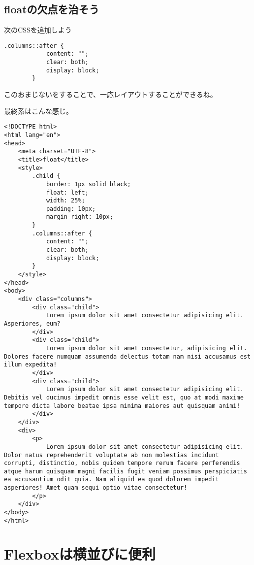 \documentclass[mingoth,11pt,a4j,uplatex]{jsarticle}
\begin{document}
\subsection{floatの欠点を治そう}
次のCSSを追加しよう
\begin{lstlisting}[caption=CSS部分2]
        .columns::after {
            content: "";
            clear: both;
            display: block;
        }
\end{lstlisting}
このおまじないをすることで、一応レイアウトすることができるね。

最終系はこんな感じ。
\begin{lstlisting}[caption=CSS部分1]
<!DOCTYPE html>
<html lang="en">
<head>
    <meta charset="UTF-8">
    <title>float</title>
    <style>
        .child {
            border: 1px solid black;
            float: left;
            width: 25%;
            padding: 10px;
            margin-right: 10px;
        }
        .columns::after {
            content: "";
            clear: both;
            display: block;
        }
    </style>
</head>
<body>
    <div class="columns">
        <div class="child">
            Lorem ipsum dolor sit amet consectetur adipisicing elit. Asperiores, eum?
        </div>
        <div class="child">
            Lorem ipsum dolor sit amet consectetur, adipisicing elit. Dolores facere numquam assumenda delectus totam nam nisi accusamus est illum expedita!
        </div>
        <div class="child">
            Lorem ipsum dolor sit amet consectetur adipisicing elit. Debitis vel ducimus impedit omnis esse velit est, quo at modi maxime tempore dicta labore beatae ipsa minima maiores aut quisquam animi!
        </div>
    </div>
    <div>
        <p>
            Lorem ipsum dolor sit amet consectetur adipisicing elit. Dolor natus reprehenderit voluptate ab non molestias incidunt corrupti, distinctio, nobis quidem tempore rerum facere perferendis atque harum quisquam magni facilis fugit veniam possimus perspiciatis ea accusantium odit quia. Nam aliquid ea quod dolorem impedit asperiores! Amet quam sequi optio vitae consectetur!
        </p>
    </div>
</body>
</html>
\end{lstlisting}


\section{Flexboxは横並びに便利}
\end{document}

